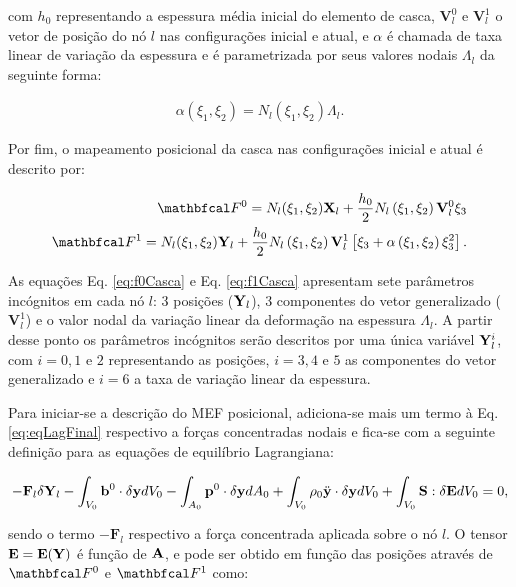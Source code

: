 \documentclass[tese_patricia]{subfiles}
\begin{document}
\noindent com $h_{0}$ representando a espessura média inicial do elemento de casca, $\mathbf{V}_{l}^{0}$ e $\mathbf{V}_{l}^{1}$ o vetor de posição do nó $l$ nas configurações inicial e atual, e $\alpha$ é chamada de taxa linear de variação da espessura e é parametrizada por seus valores nodais $\Lambda_{l}$ da seguinte forma:

\begin{align}
\alpha\left(\xi_{1},\xi_{2}\right) = N_{l}\left(\xi_{1},\xi_{2}\right)\Lambda_{l}.
\end{align}

Por fim, o mapeamento posicional da casca nas configurações inicial e atual é descrito por:

\begin{align}
\deformation^{0} =  N_{l} (\xi_{1},\xi_{2}) \mathbf{X}_{l} + \frac{h_{0}}{2}N_{l}\left(\xi_{1},\xi_{2}\right)\mathbf{V}_{l}^{0}\xi_{3} \label{eq:f0Casca} \\ 
\deformation^{1} =  N_{l} (\xi_{1},\xi_{2}) \SolidPos_{l} +  \frac{h_{0}}{2}N_{l}\left(\xi_{1},\xi_{2}\right)\mathbf{V}_{l}^{1}\left[\xi_{3} + \alpha\left(\xi_{1},\xi_{2}\right)\xi_{3}^2\right]. \label{eq:f1Casca}
\end{align}

As equações Eq. \eqref{eq:f0Casca} e Eq. \eqref{eq:f1Casca} apresentam sete parâmetros incógnitos em cada nó $l$: 3 posições ($ \mathbf{Y}_{l}$), 3 componentes do vetor generalizado ($\mathbf{V}_{l}^{1}$) e o valor nodal da variação linear da deformação na espessura $\Lambda_{l}$. A partir desse ponto os parâmetros incógnitos serão descritos por uma única variável $ \mathbf{Y}_{l}^{i}$, com $i = 0,1$ e $2$ representando as posições, $i = 3,4$ e $5$ as componentes do vetor generalizado e $i = 6$ a taxa de variação linear da espessura.


Para iniciar-se a descrição do MEF posicional, adiciona-se mais um termo à Eq. \eqref{eq:eqLagFinal} respectivo a forças concentradas nodais e fica-se com a seguinte definição para as equações de equilíbrio Lagrangiana:

\begin{align}
-\mathbf{F}_{l}\delta\mathbf{Y}_{l} - \int_{V_{0}}\mathbf{b}^0 \cdot \delta\mathbf{y} dV_{0} - \int_{A_{0}} \mathbf{p}^{0} \cdot \delta\mathbf{y} dA_{0} + \int_{V_{0}} \rho_{0} \ddot{\mathbf{y}} \cdot \delta\mathbf{y} dV_{0} + \int_{V_{0}} \mathbf{S} : \delta\mathbf{E} dV_{0} = 0,
\end{align}

\noindent sendo o termo $-\mathbf{F}_{l}$ respectivo a força concentrada aplicada sobre o nó $l$. O tensor $\mathbf{E} = \mathbf{E} (\mathbf{Y})$ é função de $\mathbf{A}$, e pode ser obtido em função das posições através de $\deformation^{0} $ e $\deformation^{1} $ como:
\end{document}
